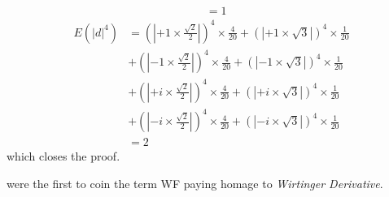 \begin{Proof}
\begin{equation*}
\begin{split}
			 &= 1
		\end{split}
	  \end{equation*}
	  \begin{equation*}
		\begin{split}
		E(\left|d\right|^4) &= \left(\left|+1 \times \frac{\sqrt{2}}{2}\right|\right)^4 \times \frac{4}{20} + \left(\left|+1 \times \sqrt{3}\right|\right)^4 \times \frac{1}{20}\\
		                    &+\left(\left|-1 \times \frac{\sqrt{2}}{2}\right|\right)^4 \times \frac{4}{20}+\left(\left|-1 \times \sqrt{3}\right|\right)^4 \times \frac{1}{20}\\
		                    &+ \left(\left|+i \times \frac{\sqrt{2}}{2}\right|\right)^4 \times \frac{4}{20} + \left(\left|+i \times \sqrt{3}\right|\right)^4 \times \frac{1}{20}\\
							&+\left(\left|-i \times \frac{\sqrt{2}}{2}\right|\right)^4 \times \frac{4}{20}+\left(\left|-i \times \sqrt{3}\right|\right)^4 \times \frac{1}{20}\\ 
			 &= 2
		\end{split}
	 \end{equation*}
	 which closes the proof.
\end{Proof}







\cite{Candes2014} were the first to coin the term \ac{WF} paying homage to \emph{Wirtinger Derivative}. 

















